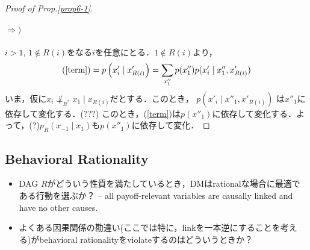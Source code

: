 \documentclass[11pt,a4paper,dvipdfmx]{article}
\theoremstyle{plain}
\begin{document}
\begin{proof}[Proof of Prop.\ref{prop6-1}]
	\paragraph{$\Rightarrow)$}
	$i > 1$, $1 \notin R(i)$をなる$i$を任意にとる．$1 \notin R(i)$より，
	\[
	(\text{\ref{term}})
		= p \left(x'_i \mid x'_{R(i)} \right)
		= \sum_{x''_1} p(x''_1) p(x'_i \mid x''_1, x'_{R(i)})
	\]
	いま，仮に$x_i \not\perp_{R^*} x_1 \mid x_{R(i)}$だとする．このとき，
	$p(x'_i \mid x''_1, x'_{R(i)})$
	は$x''_1$に依存して変化する．(???)
	このとき，(\ref{term})は$p(x''_1)$に依存して変化する．よって，(?)$p_R(x_{-1} \mid x_1)$も$p(x''_1)$に依存して変化．
\end{proof}




\newpage
\subsection{Behavioral Rationality}
\begin{screen}
\begin{itemize}
	\item DAG $R$がどういう性質を満たしているとき，DMはrationalな場合に最適である行動を選ぶか？ -- all payoff-relevant variables are causally linked and have no other causes.
	\item よくある因果関係の勘違い(ここでは特に，linkを一本逆にすることを考える)がbehavioral rationalityをviolateするのはどういうときか？
\end{itemize}
\end{screen}
\end{document}
